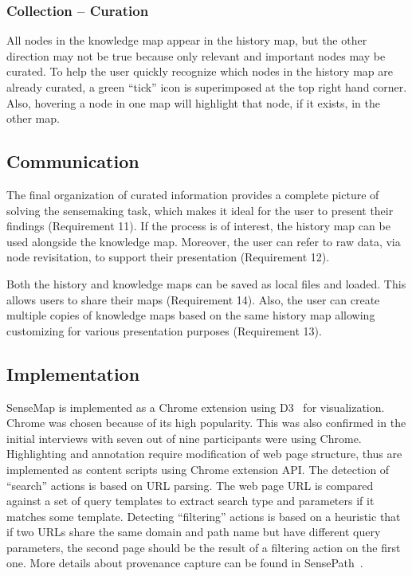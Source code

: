 \subsubsection{Collection -- Curation}
All nodes in the knowledge map appear in the history map, but the other direction may not be true because only relevant and important nodes may be curated. To help the user quickly recognize which nodes in the history map are already curated, a green ``tick'' icon is superimposed at the top right hand corner. Also, hovering a node in one map will highlight that node, if it exists, in the other map.

\subsection{Communication}
The final organization of curated information provides a complete picture of solving the sensemaking task, which makes it ideal for the user to present their findings (Requirement 11). If the process is of interest, the history map can be used alongside the knowledge map. Moreover, the user can refer to raw data, via node revisitation, to support their presentation (Requirement 12).

Both the history and knowledge maps can be saved as local files and loaded. This allows users to share their maps (Requirement 14). Also, the user can create multiple copies of knowledge maps based on the same history map allowing customizing for various presentation purposes (Requirement 13).

\subsection{Implementation}
SenseMap is implemented as a Chrome extension using D3~\cite{Bostock2011} for visualization. Chrome was chosen because of its high popularity. This was also confirmed in the initial interviews with seven out of nine participants were using Chrome. Highlighting and annotation require modification of web page structure, thus are implemented as content scripts using Chrome extension API. The detection of ``search'' actions is based on URL parsing. The web page URL is compared against a set of query templates to extract search type and parameters if it matches some template. Detecting ``filtering'' actions is based on a heuristic that if two URLs share the same domain and path name but have different query parameters, the second page should be the result of a filtering action on the first one. More details about provenance capture can be found in SensePath~\cite{Nguyen2016}.

